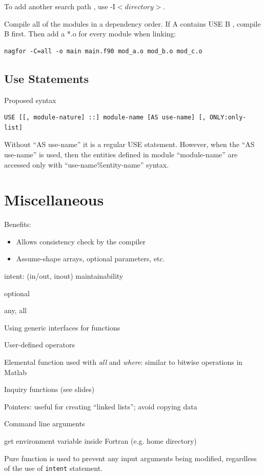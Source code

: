 \documentclass[11pt]{book} %
\begin{document}
To add another search path , use -I$<directory>$.

Compile all of the modules in a dependency order. If A contains USE B , compile B first. Then add a *.o for every module when linking:
\begin{verbatim}
nagfor -C=all -o main main.f90 mod_a.o mod_b.o mod_c.o
\end{verbatim}

\subsection{Use Statements}

Proposed syntax
\begin{verbatim}
USE [[, module-nature] ::] module-name [AS use-name] [, ONLY:only-list]
\end{verbatim}

Without “AS use-name” it is a regular USE statement. However, when the “AS use-name” is used, then the entities defined in module “module-name” are accessed only with “use-name\%entity-name” syntax.


\section{Miscellaneous}

Benefits:
\begin{itemize}
\item Allows consistency check by the compiler
\item Assume-shape arrays, optional parameters, etc.
\end{itemize}

intent: (in/out, inout) maintainability

optional

any, all

Using generic interfaces for functions

User-defined operators

Elemental function used with \emph{all} and \emph{where}: similar to bitwise operations in Matlab

Inquiry functions (see slides)

Pointers: useful for creating ``linked lists''; avoid copying data

Command line arguments

get environment variable inside Fortran (e.g. home directory)

Pure function is used to prevent any input arguments being modified, regardless of the use of \verb|intent| statement.
\end{document}
